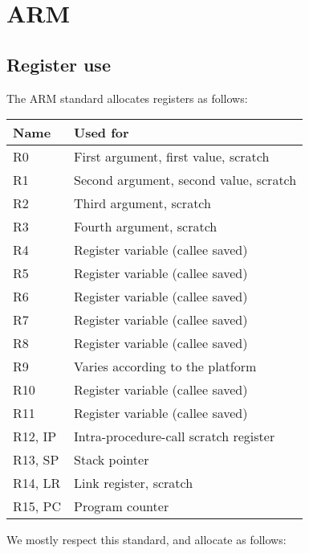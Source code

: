 \chapter{ARM}

\section{Register use}

The ARM standard allocates registers as follows:

\begin{tabular}{|l|l|}
\hline
Name & Used for\\
\hline
\hline
R0 & First argument, first value, scratch\\
R1 & Second argument, second value, scratch \\
R2 & Third argument, scratch \\
R3 & Fourth argument, scratch \\
R4 & Register variable (callee saved) \\
R5 & Register variable (callee saved) \\
R6 & Register variable (callee saved) \\
R7 & Register variable (callee saved) \\
R8 & Register variable (callee saved) \\
R9 & Varies according to the platform\\
R10 & Register variable (callee saved) \\
R11 & Register variable (callee saved) \\
R12, IP & Intra-procedure-call scratch register\\
R13, SP & Stack pointer \\
R14, LR & Link register, scratch \\
R15, PC & Program counter \\
\hline
\end{tabular}

We mostly respect this standard, and allocate as follows:

